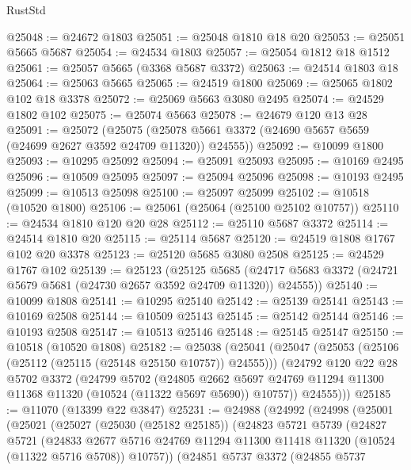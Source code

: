\begin{lexlean}{RustStd}
\begin{coremodule}
@25048 := @24672 @1803
@25051 := @25048 @1810 @18 @20
@25053 := @25051 @5665 @5687
@25054 := @24534 @1803
@25057 := @25054 @1812 @18 @1512
@25061 := @25057 @5665 (@3368 @5687 @3372)
@25063 := @24514 @1803 @18
@25064 := @25063 @5665
@25065 := @24519 @1800
@25069 := @25065 @1802 @102 @18 @3378
@25072 := @25069 @5663 @3080 @2495
@25074 := @24529 @1802 @102
@25075 := @25074 @5663
@25078 := @24679 @120 @13 @28
@25091 := @25072
    (@25075 (@25078 @5661 @3372 (@24690 @5657 @5659 (@24699 @2627 @3592 @24709 @11320)) @24555))
@25092 := @10099 @1800
@25093 := @10295 @25092
@25094 := @25091 @25093
@25095 := @10169 @2495
@25096 := @10509 @25095
@25097 := @25094 @25096
@25098 := @10193 @2495
@25099 := @10513 @25098
@25100 := @25097 @25099
@25102 := @10518 (@10520 @1800)
@25106 := @25061 (@25064 (@25100 @25102 @10757))
@25110 := @24534 @1810 @120 @20 @28
@25112 := @25110 @5687 @3372
@25114 := @24514 @1810 @20
@25115 := @25114 @5687
@25120 := @24519 @1808 @1767 @102 @20 @3378
@25123 := @25120 @5685 @3080 @2508
@25125 := @24529 @1767 @102
@25139 := @25123
    (@25125
      @5685
      (@24717 @5683 @3372 (@24721 @5679 @5681 (@24730 @2657 @3592 @24709 @11320)) @24555))
@25140 := @10099 @1808
@25141 := @10295 @25140
@25142 := @25139 @25141
@25143 := @10169 @2508
@25144 := @10509 @25143
@25145 := @25142 @25144
@25146 := @10193 @2508
@25147 := @10513 @25146
@25148 := @25145 @25147
@25150 := @10518 (@10520 @1808)
@25182 := @25038
    (@25041
      (@25047
        (@25053 (@25106 (@25112 (@25115 (@25148 @25150 @10757)) @24555)))
        (@24792
          @120
          @22
          @28
          @5702
          @3372
          (@24799
            @5702
            (@24805
              @2662
              @5697
              @24769
              @11294
              @11300
              @11368
              @11320
              (@10524 (@11322 @5697 @5690))
              @10757))
          @24555)))
@25185 := @11070 (@13399 @22 @3847)
@25231 := @24988
    (@24992
      (@24998
        (@25001
          (@25021
            (@25027
              (@25030 (@25182 @25185))
              (@24823
                @5721
                @5739
                (@24827
                  @5721
                  (@24833
                    @2677
                    @5716
                    @24769
                    @11294
                    @11300
                    @11418
                    @11320
                    (@10524 (@11322 @5716 @5708))
                    @10757))
                (@24851
                  @5737
                  @3372
                  (@24855
                    @5737

\end{coremodule}
\end{lexlean}
